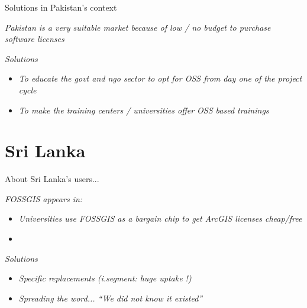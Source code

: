 \documentclass[xcolor=dvipsnames,beamer]{beamer} %
\begin{document}
\begin{frame}[fragile]{Solutions in Pakistan's context}

{\it Pakistan is a very suitable market because of low / no budget to purchase software licenses}

\begin{block}{{\it Solutions}}
\begin{itemize}
 \item {\it To educate the govt and ngo sector to opt for OSS from day one of the project cycle}
 \item {\it To make the training centers / universities offer OSS based trainings}
\end{itemize}
\end{block}

\end{frame}

\section{Sri Lanka}
\begin{frame}[fragile]{About Sri Lanka's users...}

\begin{block}{{\it FOSSGIS appears in:}}
\begin{itemize}
 \item {\it Universities use FOSSGIS as a bargain chip to get ArcGIS licenses cheap/free}
 \item {\it }
\end{itemize}
\end{block}


\begin{block}{{\it Solutions}}
\begin{itemize}
 \item {\it Specific replacements (i.segment: huge uptake !)}
 \item {\it Spreading the word... ``We did not know it existed''}
\end{itemize}
\end{block}

\end{frame}
\end{document}
